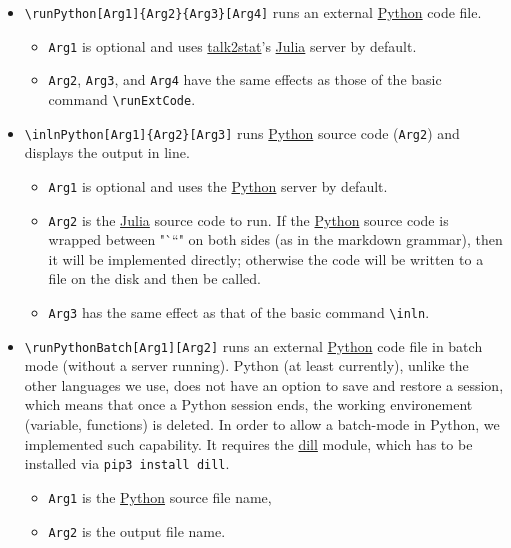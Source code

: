 \documentclass{ltxdoc}
\begin{document}
\begin{itemize}
\item \texttt{\textbackslash{}runPython[Arg1]\{Arg2\}\{Arg3\}[Arg4]} runs an external
\href{https://www.python.org/}{Python} code file.
\begin{itemize}
\item \texttt{Arg1} is optional and uses
\href{https://pypi.org/project/talk2stat/}{talk2stat}'s
\href{https://julialang.org/}{Julia} server by default.
\item \texttt{Arg2}, \texttt{Arg3}, and \texttt{Arg4} have the same effects as those of the
basic command \texttt{\textbackslash{}runExtCode}.
\end{itemize}
\item \texttt{\textbackslash{}inlnPython[Arg1]\{Arg2\}[Arg3]} runs
\href{https://www.python.org/}{Python} source code (\texttt{Arg2}) and displays
the output in line.
\begin{itemize}
\item \texttt{Arg1} is optional and uses the \href{https://www.python.org/}{Python}
server by default.
\item \texttt{Arg2} is the \href{https://julialang.org/}{Julia} source code to run.
If the \href{https://www.python.org/}{Python} source code is wrapped
between "```" on both sides (as in the markdown grammar), then it
will be implemented directly; otherwise the code will be written to
a file on the disk and then be called.
\item \texttt{Arg3} has the same effect as that of the basic command \texttt{\textbackslash{}inln}.
\end{itemize}
\item \texttt{\textbackslash{}runPythonBatch[Arg1][Arg2]} runs an external
\href{https://www.python.org/}{Python} code file in batch mode (without a
server running). Python (at least currently), unlike the other
languages we use, does not have an option to save and restore a
session, which means that once a Python session ends, the working
environement (variable, functions) is deleted. In order to allow a
batch-mode in Python, we implemented such capability. It requires the
\href{https://pypi.org/project/dill/}{dill} module, which has to be
installed via \texttt{pip3 install dill}.
\begin{itemize}
\item \texttt{Arg1} is the \href{https://www.python.org/}{Python} source file name,
\item \texttt{Arg2} is the output file name.
\end{itemize}
\end{itemize}
\end{document}
